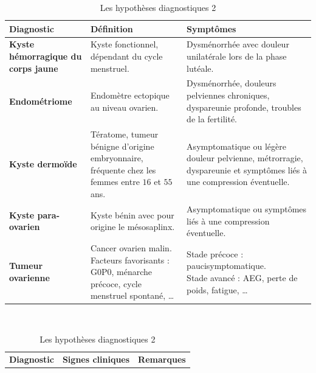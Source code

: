 \begin{table}[htbp]
\centering
\caption{Les hypothèses diagnostiques 2}
\label{tab:hypothesesDiagnostiques2}
\begin{tabular} {|>{\raggedright\arraybackslash}p{}|>{\raggedright\arraybackslash}p{}|>{\raggedright\arraybackslash}p{}|}
        \toprule
        \rowcolor{gray!40}
        \textbf{Diagnostic} & \textbf{Définition} & \textbf{Symptômes} \\
        \midrule
        \hline
        \rowcolor{red!10}
        \textbf{Kyste hémorragique du corps jaune} & Kyste fonctionnel, dépendant du cycle menstruel. & Dysménorrhée avec douleur unilatérale lors de la phase lutéale.\\
        \hline
        \rowcolor{Bittersweet!12}
        \textbf{Endométriome} & Endomètre ectopique au niveau ovarien. & Dysménorrhée, douleurs pelviennes chroniques, dyspareunie profonde, troubles de la fertilité.\\
        \hline
        \rowcolor{yellow!15}
        \textbf{Kyste dermoïde} & Tératome, tumeur bénigne d'origine embryonnaire, fréquente chez les femmes entre $16$ et $55$ ans. & Asymptomatique ou légère douleur pelvienne, métrorragie, dyspareunie et symptômes liés à une compression éventuelle.\\
        \hline
        \rowcolor{green!10}
        \textbf{Kyste para-ovarien} & Kyste bénin avec pour origine le mésosaplinx. & Asymptomatique ou symptômes liés à une compression éventuelle.\\
        \hline
        \rowcolor{cyan!10}
        \vspace{-3mm} \textbf{Tumeur ovarienne} & \vspace{-3mm} Cancer ovarien malin. Facteurs favorisants : G$0$P$0$, ménarche précoce, cycle menstruel spontané, \ldots & \vspace{-3mm} \parbox{0.2\textwidth}{Stade précoce : paucisymptomatique. \\ Stade avancé : AEG, perte de poids, fatigue, \ldots}\\
        \hline
\end{tabular}
\\[5mm]
\begin{tabular} {|>{\raggedright\arraybackslash}p{}|>{\raggedright\arraybackslash}p{}|>{\raggedright\arraybackslash}p{}|}
        \toprule
        \rowcolor{gray!40}
        \textbf{Diagnostic} & \textbf{Signes cliniques} & \textbf{Remarques} \\

\end{tabular}
\end{table}
